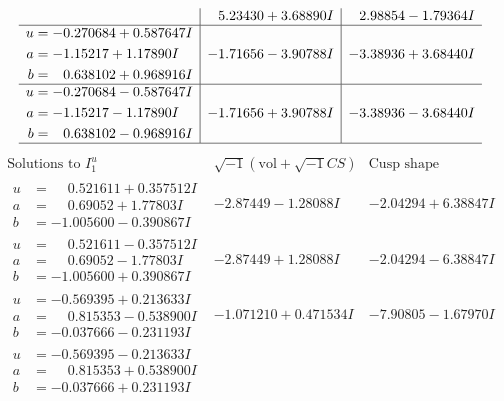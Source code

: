 \documentclass[1p]{elsarticle_modified}
\theoremstyle{definition}
\newcommand{\I}{\sqrt{-1}}
\begin{document}
$$\begin{array}{c|c|c}
 & \phantom{-}5.23430 + 3.68890 I & \phantom{-}2.98854 - 1.79364 I \\ \hline\begin{aligned}
u &= -0.270684 + 0.587647 I \\
a &= -1.15217 + 1.17890 I \\
b &= \phantom{-}0.638102 + 0.968916 I\end{aligned}
 & -1.71656 - 3.90788 I & -3.38936 + 3.68440 I \\ \hline\begin{aligned}
u &= -0.270684 - 0.587647 I \\
a &= -1.15217 - 1.17890 I \\
b &= \phantom{-}0.638102 - 0.968916 I\end{aligned}
 & -1.71656 + 3.90788 I & -3.38936 - 3.68440 I\\
 \hline 
 \end{array}$$\newpage$$\begin{array}{c|c|c}  
\text{Solutions to }I^u_{1}& \I (\text{vol} + \sqrt{-1}CS) & \text{Cusp shape}\\
 \hline 
\begin{aligned}
u &= \phantom{-}0.521611 + 0.357512 I \\
a &= \phantom{-}0.69052 + 1.77803 I \\
b &= -1.005600 - 0.390867 I\end{aligned}
 & -2.87449 - 1.28088 I & -2.04294 + 6.38847 I \\ \hline\begin{aligned}
u &= \phantom{-}0.521611 - 0.357512 I \\
a &= \phantom{-}0.69052 - 1.77803 I \\
b &= -1.005600 + 0.390867 I\end{aligned}
 & -2.87449 + 1.28088 I & -2.04294 - 6.38847 I \\ \hline\begin{aligned}
u &= -0.569395 + 0.213633 I \\
a &= \phantom{-}0.815353 - 0.538900 I \\
b &= -0.037666 - 0.231193 I\end{aligned}
 & -1.071210 + 0.471534 I & -7.90805 - 1.67970 I \\ \hline\begin{aligned}
u &= -0.569395 - 0.213633 I \\
a &= \phantom{-}0.815353 + 0.538900 I \\
b &= -0.037666 + 0.231193 I\end{aligned}

\end{array}$$
\end{document}
